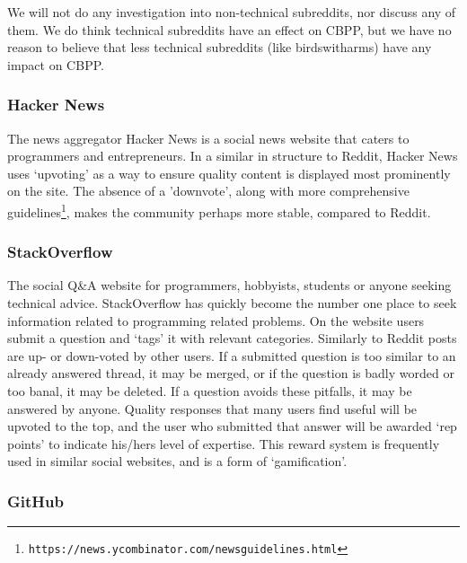 \documentclass[a4paper,11pt]{article} %
\begin{document}
We will not do any investigation into non-technical subreddits, nor discuss
any of them. We do think technical subreddits have an effect on CBPP, but we
have no reason to believe that less technical subreddits (like
birdswitharms) have any impact on CBPP.

\subsubsection*{Hacker News}
The news aggregator Hacker News is a social news website that caters to
programmers and entrepreneurs. In a similar in structure to Reddit, Hacker
News uses ‘upvoting’ as a way to ensure quality content is displayed most
prominently on the site. The absence of a 'downvote', along with more
comprehensive guidelines\footnote{\texttt{https://news.ycombinator.com/newsguidelines.html}},
makes the community perhaps more stable, compared to Reddit.


\subsubsection*{StackOverflow}

The social Q\&A website for programmers, hobbyists, students or anyone
seeking technical advice. StackOverflow has quickly become the number one
place to seek information related to programming related problems. On the
website users submit a question and ‘tags’ it with relevant categories.
Similarly to Reddit posts are up- or down-voted by other users. If a
submitted question is too similar to an already answered thread, it may be
merged, or if the question is badly worded or too banal, it may be
deleted. If a question avoids these pitfalls, it may be answered by
anyone. Quality responses that many users find useful will be upvoted to the
top, and the user who submitted that answer will be awarded ‘rep points’ to
indicate his/hers level of expertise. This reward system is frequently used
in similar social websites, and is a form of ‘gamification’.

\subsubsection*{GitHub}
\end{document}
